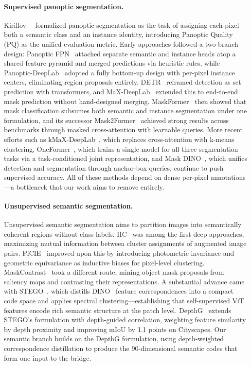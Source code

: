 \documentclass[10pt,twocolumn,letterpaper]{article}
\begin{document}
\paragraph{Supervised panoptic segmentation.}
Kirillov~\etal~\cite{kirillov2019panoptic} formalized panoptic segmentation as the task of assigning each pixel both a semantic class and an instance identity, introducing Panoptic Quality (PQ) as the unified evaluation metric. Early approaches followed a two-branch design: Panoptic FPN~\cite{kirillov2019panopticfpn} attached separate semantic and instance heads atop a shared feature pyramid and merged predictions via heuristic rules, while Panoptic-DeepLab~\cite{cheng2020panopticdeeplab} adopted a fully bottom-up design with per-pixel instance centers, eliminating region proposals entirely. DETR~\cite{carion2020detr} reframed detection as set prediction with transformers, and MaX-DeepLab~\cite{wang2021maxdeeplab} extended this to end-to-end mask prediction without hand-designed merging. MaskFormer~\cite{cheng2021maskformer} then showed that mask classification subsumes both semantic and instance segmentation under one formulation, and its successor Mask2Former~\cite{cheng2022mask2former} achieved strong results across benchmarks through masked cross-attention with learnable queries. More recent efforts such as kMaX-DeepLab~\cite{yu2022kmaxdeeplab}, which replaces cross-attention with k-means clustering, OneFormer~\cite{jain2023oneformer}, which trains a single model for all three segmentation tasks via a task-conditioned joint representation, and Mask DINO~\cite{li2023maskdino}, which unifies detection and segmentation through anchor-box queries, continue to push supervised accuracy. All of these methods depend on dense per-pixel annotations---a bottleneck that our work aims to remove entirely.

\paragraph{Unsupervised semantic segmentation.}
Unsupervised semantic segmentation aims to partition images into semantically coherent regions without class labels. IIC~\cite{ji2019iic} was among the first deep approaches, maximizing mutual information between cluster assignments of augmented image pairs. PiCIE~\cite{cho2021picie} improved upon this by introducing photometric invariance and geometric equivariance as inductive biases for pixel-level clustering. MaskContrast~\cite{vangansbeke2021maskcontrast} took a different route, mining object mask proposals from saliency maps and contrasting their representations. A substantial advance came with STEGO~\cite{hamilton2022stego}, which distills DINO~\cite{caron2021dino} feature correspondences into a compact code space and applies spectral clustering---establishing that self-supervised ViT features encode rich semantic structure at the patch level. DepthG~\cite{sick2024depthg} extends STEGO's formulation with depth-guided correlation, weighting feature similarity by depth proximity and improving mIoU by 1.1 points on Cityscapes. Our semantic branch builds on the DepthG formulation, using depth-weighted correspondence distillation to produce the 90-dimensional semantic codes that form one input to the bridge.
\end{document}
